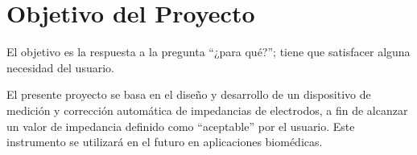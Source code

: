 \section{Objetivo del Proyecto}
\color{blue}El objetivo es la respuesta a la pregunta “¿para qué?”; tiene que satisfacer alguna necesidad del usuario.\\ \color{black}

El presente proyecto se basa en el diseño y desarrollo de un dispositivo de medición y corrección automática de impedancias de electrodos, a fin de alcanzar un valor de impedancia definido como ``aceptable'' por el usuario. Este instrumento se utilizará en el futuro en aplicaciones biomédicas.\\




